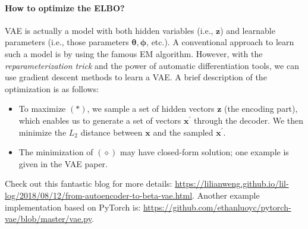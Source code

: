 \paragraph{How to optimize the ELBO?} VAE is actually a model with both hidden variables (i.e., $\bm{z}$) and learnable parameters (i.e., those parameters $\bm{\theta}, \bm{\phi}$, etc.). 
A conventional approach to learn such a model is by using the famous EM algorithm. 
However, with the \emph{reparameterization trick} and the power of automatic differentiation tools, we can use gradient descent methods to learn a VAE.
A brief description of the optimization is as follows:
    \begin{itemize}
        \item To maximize $(\ast)$, we sample a set of hidden vectors $\bm{z}$ (the encoding part), which enables us to generate a set of vectors $\bm{x}^\prime$ through the decoder. We then minimize the $L_2$ distance between $\bm{x}$ and the sampled $\bm{x}^\prime$.
        \item The minimization of $(\diamond)$ may have closed-form solution; one example is given  in the VAE paper.
    \end{itemize}
Check out this fantastic blog for more details: \url{https://lilianweng.github.io/lil-log/2018/08/12/from-autoencoder-to-beta-vae.html}.
Another example implementation based on PyTorch is: \url{https://github.com/ethanluoyc/pytorch-vae/blob/master/vae.py}.


